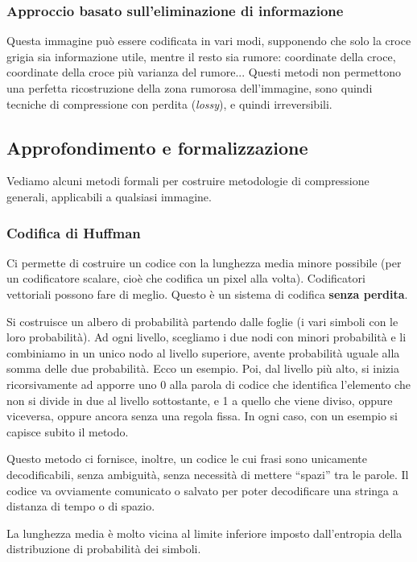 \documentclass[a4paper,11pt]{article}
\begin{document}
\subsubsection{Approccio basato sull'eliminazione di informazione}
Questa immagine può essere codificata in vari modi, supponendo che solo la croce grigia sia informazione utile, mentre il resto sia rumore: coordinate della croce, coordinate della croce più
varianza del rumore... Questi metodi non permettono una perfetta ricostruzione della zona rumorosa dell'immagine, sono quindi tecniche di compressione con perdita (\textit{lossy}), e
quindi irreversibili.

\subsection{Approfondimento e formalizzazione}
Vediamo alcuni metodi formali per costruire metodologie di compressione generali, applicabili a qualsiasi immagine.

\subsubsection{Codifica di Huffman}
Ci permette di costruire un codice con la lunghezza media minore possibile (per un codificatore scalare, cioè che codifica un pixel alla volta). Codificatori vettoriali possono fare di meglio.
Questo è un sistema di codifica \textbf{senza perdita}.
\par
Si costruisce un albero di probabilità partendo dalle foglie (i vari simboli con le loro probabilità). Ad ogni livello, scegliamo i due nodi con minori probabilità e li combiniamo in un unico
nodo al livello superiore, avente probabilità uguale alla somma delle due probabilità. Ecco un esempio.
Poi, dal livello più alto, si inizia ricorsivamente ad apporre uno 0 alla parola di codice che identifica l'elemento che non si divide in due al livello sottostante, e 1 a quello che viene diviso, oppure
viceversa, oppure ancora senza una regola fissa. In ogni caso, con un esempio si capisce subito il metodo.
\par
Questo metodo ci fornisce, inoltre, un codice le cui frasi sono unicamente decodificabili, senza ambiguità, senza necessità di mettere ``spazi'' tra le parole. Il codice va ovviamente
comunicato o salvato per poter decodificare una stringa a distanza di tempo o di spazio.
\par
La lunghezza media è molto vicina al limite inferiore imposto dall'entropia della distribuzione di probabilità dei simboli.
\end{document}
